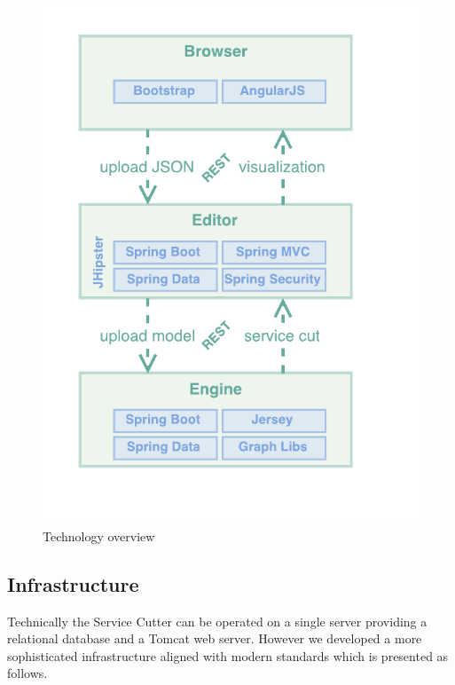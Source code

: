 \begin{minipage}[t]{0.5\textwidth}
	\begin{figure}[H]
		\includegraphics[scale=1]{diagrams/Technologies.pdf}
		\caption{Technology overview}
		\label{fig:technologies}
	\end{figure}
\end{minipage}


\subsection{Infrastructure}
\label{subsec:infrastructure}

Technically the Service Cutter can be operated on a single server providing a relational database and a Tomcat web server. However we developed a more sophisticated infrastructure aligned with modern standards which is presented as follows.

